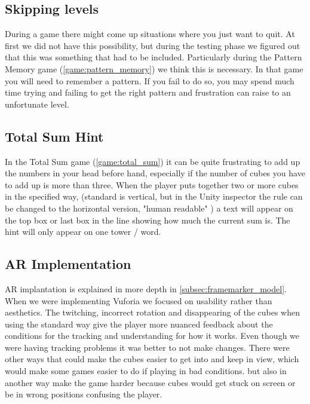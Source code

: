 \subsection{Skipping levels}
During a game there might come up situations where you just want to quit. At
first we did not have this possibility, but during the testing phase we figured
out that this was something that had to be included. Particularly during the
Pattern Memory game (\ref{game:pattern_memory}) we think this is necessary. In
that game you will need to remember a pattern. If you fail to do so, you may
spend much time trying and failing to get the right pattern and frustration can
raise to an unfortunate level. 

\subsection{Total Sum Hint}
In the Total Sum game (\ref{game:total_sum}) it can be quite frustrating to add up the numbers in your head before hand, especially if the number of cubes you have to add up is more than three. When the player puts together two or more cubes in the specified way, (standard is vertical, but in the Unity inspector the rule can be changed to the horizontal version, "human readable" ) a text will appear on the top box or last box in the line showing how much the current sum is. The hint will only appear on one tower / word.

\subsection{AR Implementation}
AR implantation is explained in more depth in \ref{subsec:framemarker_model}.
When we were implementing Vuforia we focused on usability rather than aesthetics. The twitching, incorrect rotation and disappearing of the cubes when using the standard way give the player more nuanced feedback about the conditions for the tracking and understanding for how it works. Even though we were having tracking problems it was better to not make changes. There were other ways that could make the cubes easier to get into and keep in view, which would make some games easier to do if playing in bad conditions. but also in another way make the game harder because cubes would get stuck on screen or be in wrong positions confusing the player.



